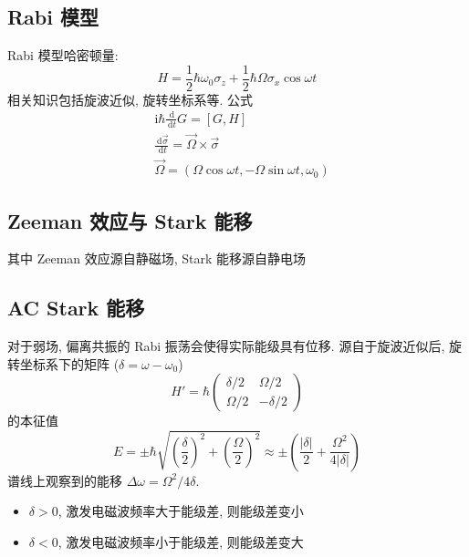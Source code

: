 \documentclass[10pt,a4paper,twocolumn]{article} %
\numberwithin{equation}{section} %
\newcommand{\dif}{\,\mathrm d}
\newcommand\mi{\mathrm{i}}
\begin{document}
\subsection{Rabi 模型} %
\label{sub:rabi_model}
Rabi 模型哈密顿量: 
\begin{equation}
	H = \frac 12 \hbar\omega_0 \sigma_z + 
	\frac 12 \hbar\Omega \sigma_x\cos\omega t
\end{equation}
相关知识包括旋波近似, 旋转坐标系等. 公式
\begin{align}
	&\mi\hbar\frac{\dif}{\dif t} G = [G, H] \\
	&\frac{\dif\vec\sigma}{\dif t} = \vec \Omega\times\vec \sigma \\
	&\vec \Omega = (\Omega\cos\omega t, -\Omega\sin\omega t,\omega_0)
\end{align}

\subsection{Zeeman 效应与 Stark 能移} %
\label{sub:zeeman_effect_and_stark_shift}
其中 Zeeman 效应源自静磁场, Stark 能移源自静电场

\subsection{AC Stark 能移} %
\label{sub:ac_stark_shift}
对于弱场, 偏离共振的 Rabi 振荡会使得实际能级具有位移. 源自于旋波近似后, 
旋转坐标系下的矩阵 ($\delta = \omega - \omega_0$)
\begin{equation}
	H' = \hbar \begin{pmatrix}
		\delta/2 & \Omega/2 \\
		\Omega/2 & -\delta/2
	\end{pmatrix}
\end{equation}
的本征值
\begin{equation}
	E = \pm\hbar\sqrt{\left(\frac\delta 2\right)^2 + 
	\left(\frac\Omega 2\right)^2} \approx 
	\pm\left(\frac{|\delta|} 2 + \frac{\Omega^2}{4|\delta|}\right)
\end{equation}
谱线上观察到的能移 $\Delta\omega = \Omega^2/4\delta$. 
\begin{itemize}
	\item $\delta > 0$, 激发电磁波频率大于能级差, 则能级差变小
	\item $\delta < 0$, 激发电磁波频率小于能级差, 则能级差变大
\end{itemize}
\end{document}
